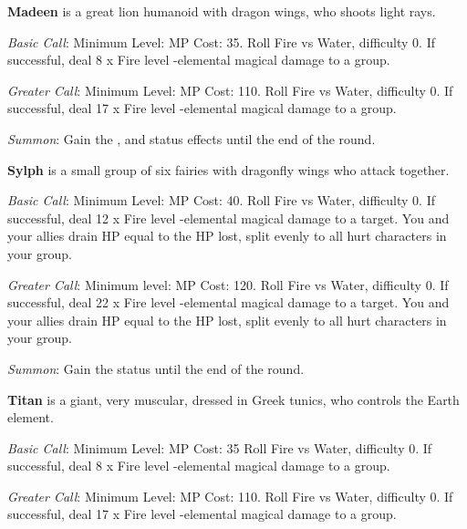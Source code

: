 \begin{multicols}{2}
    \textbf{Madeen} is a great lion humanoid with dragon wings, who shoots light rays.
    
    \textit{Basic Call}: Minimum Level:  MP Cost: 35. Roll Fire vs Water, difficulty 0. If successful, deal 8 x Fire level -elemental magical damage to a group.
    
    \textit{Greater Call}: Minimum Level:  MP Cost: 110. Roll Fire vs Water, difficulty 0. If successful, deal 17 x Fire level -elemental magical damage to a group.
    
    \textit{Summon}: Gain the  ,   and   status effects until the end of the round.

    \ffcrystal[type=level,height=8pt]
    
    \textbf{Sylph} is a small group of six fairies with dragonfly wings who attack together.
    
    \textit{Basic Call}: Minimum Level:  MP Cost: 40. Roll Fire vs Water, difficulty 0. If successful, deal 12 x Fire level -elemental magical damage to a target. You and your allies drain HP equal to the HP lost, split evenly to all hurt characters in your group.
    
    \textit{Greater Call}: Minimum level:  MP Cost: 120. Roll Fire vs Water, difficulty 0. If successful, deal 22 x Fire level -elemental magical damage to a target. You and your allies drain HP equal to the HP lost, split evenly to all hurt characters in your group.
    
    \textit{Summon}: Gain the  status until the end of the round.

    \ffcrystal[type=level,height=8pt]
    
    \textbf{Titan} is a giant, very muscular, dressed in Greek tunics, who controls the Earth element.
    
    \textit{Basic Call}: Minimum Level:  MP Cost: 35 Roll Fire vs Water, difficulty 0. If successful, deal 8 x Fire level -elemental magical damage to a group.
    
    \textit{Greater Call}: Minimum Level:  MP Cost: 110. Roll Fire vs Water, difficulty 0. If successful, deal 17 x Fire level -elemental magical damage to a group.
    

\end{multicols}
